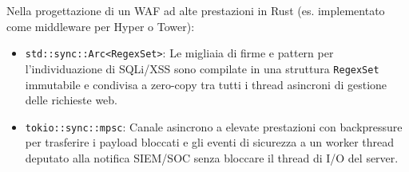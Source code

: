 \documentclass[11pt,a4paper]{article}
\begin{document}
\begin{altbox}
Nella progettazione di un WAF ad alte prestazioni in Rust (es. implementato come middleware per Hyper o Tower):
\begin{itemize}
    \item \texttt{std::sync::Arc<RegexSet>}: Le migliaia di firme e pattern per l'individuazione di SQLi/XSS sono compilate in una struttura \texttt{RegexSet} immutabile e condivisa a zero-copy tra tutti i thread asincroni di gestione delle richieste web.
    \item \texttt{tokio::sync::mpsc}: Canale asincrono a elevate prestazioni con backpressure per trasferire i payload bloccati e gli eventi di sicurezza a un worker thread deputato alla notifica SIEM/SOC senza bloccare il thread di I/O del server.
\end{itemize}
\end{altbox}
\end{document}
